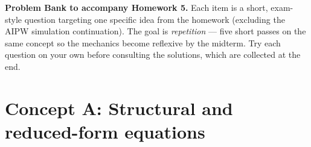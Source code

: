 \documentclass{article}
\begin{document}
\noindent\textbf{Problem Bank to accompany Homework 5.}  Each item is a short, exam-style question targeting one specific idea from the homework (excluding the AIPW simulation continuation).  The goal is \emph{repetition} --- five short passes on the same concept so the mechanics become reflexive by the midterm.  Try each question on your own before consulting the solutions, which are collected at the end.

\bigskip

\section*{Concept A: Structural and reduced-form equations}
\end{document}
